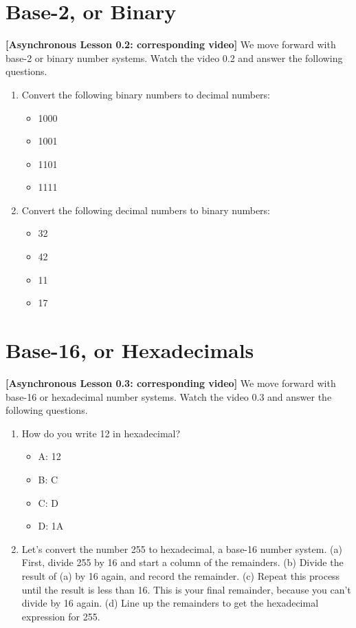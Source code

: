\documentclass[10pt]{article}
\begin{document}
\section{Base-2, or Binary}

\textbf{[Asynchronous Lesson 0.2: corresponding video]}  We move forward with base-2 or binary number systems.  Watch the video 0.2 and answer the following questions.

\begin{enumerate}
\item Convert the following binary numbers to decimal numbers:
\begin{itemize}
\item 1000
\item 1001
\item 1101
\item 1111
\end{itemize}
\item Convert the following decimal numbers to binary numbers:
\begin{itemize}
\item 32
\item 42
\item 11
\item 17
\end{itemize}
\end{enumerate}

\section{Base-16, or Hexadecimals}

\textbf{[Asynchronous Lesson 0.3: corresponding video]}  We move forward with base-16 or hexadecimal number systems.  Watch the video 0.3 and answer the following questions.

\begin{enumerate}
\item How do you write 12 in hexadecimal?
\begin{itemize}
\item A: 12
\item B: C
\item C: D
\item D: 1A
\end{itemize}
\item Let's convert the number 255 to hexadecimal, a base-16 number system.  (a) First, divide 255 by 16 and start a column of the remainders.  (b) Divide the result of (a) by 16 again, and record the remainder.  (c) Repeat this process until the result is less than 16.  This is your final remainder, because you can't divide by 16 again.  (d) Line up the remainders to get the hexadecimal expression for 255. \\ \vspace{3cm}
\end{enumerate}
\end{document}
